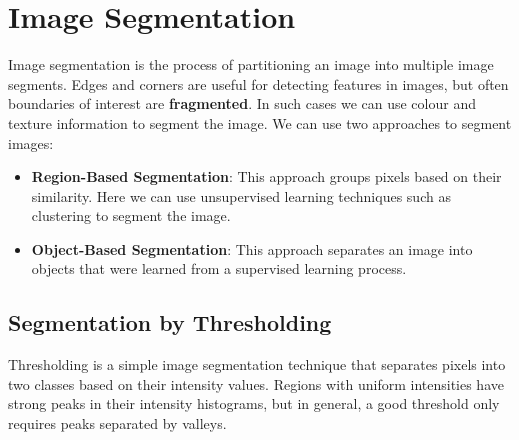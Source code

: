 \documentclass{article}
\begin{document}
\section{Image Segmentation}
Image segmentation is the process of partitioning an image into
multiple image segments. Edges and corners are useful for detecting
features in images, but often boundaries of interest are
\textbf{fragmented}. In such cases we can use colour and texture
information to segment the image. We can use two approaches to segment
images:
\begin{itemize}
    \item \textbf{Region-Based Segmentation}: This approach groups
          pixels based on their similarity. Here we can use unsupervised
          learning techniques such as clustering to segment the image.
    \item \textbf{Object-Based Segmentation}: This approach separates
          an image into objects that were learned from a supervised learning
          process.
\end{itemize}
\subsection{Segmentation by Thresholding}
Thresholding is a simple image segmentation technique that separates
pixels into two classes based on their intensity values. Regions with
uniform intensities have strong peaks in their intensity histograms,
but in general, a good threshold only requires peaks separated by
valleys.
\end{document}

